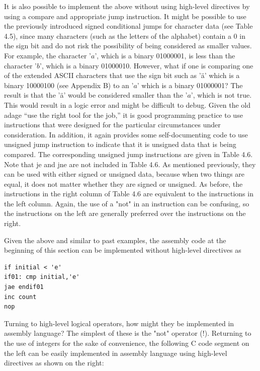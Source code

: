 \documentclass[10pt]{book}
\begin{document}
It is also possible to implement the above without using high-level directives by using a compare and appropriate jump instruction. It might be possible to use the previously introduced signed conditional jumps for character data (see Table 4.5), since many characters (such as the letters of the alphabet) contain a 0 in the sign bit and do not risk the possibility of being considered as smaller values. For example, the character '$a$', which is a binary 01000001, is less than the character '$b$', which is a binary 01000010. However, what if one is comparing one of the extended ASCII characters that use the sign bit such as 'ä' which is a binary 10000100 (see Appendix B) to an '$a$' which is a binary 01000001? The result is that the 'ä' would be considered smaller than the '$a$', which is not true. This would result in a logic error and might be difficult to debug. Given the old adage ``use the right tool for the job,'' it is good programming practice to use instructions that were designed for the particular circumstances under consideration. In addition, it again provides some self-documenting code to use unsigned jump instruction to indicate that it is unsigned data that is being compared. The corresponding unsigned jump instructions are given in Table 4.6.
Note that je and jne are not included in Table 4.6. As mentioned previously, they can be used with either signed or unsigned data, because when two things are equal, it does not matter whether they are signed or unsigned. As before, the instructions in the right column of Table 4.6 are equivalent to the instructions in the left column. Again, the use of a "not" in an instruction can be confusing, so the instructions on the left are generally preferred over the instructions on the right.

Given the above and similar to past examples, the assembly code at the beginning of this section can be implemented without high-level directives as

\begin{verbatim}
if initial < 'e'
if01: cmp initial,'e'
jae endif01
inc count
nop
\end{verbatim}

Turning to high-level logical operators, how might they be implemented in assembly language? The simplest of these is the "not" operator (!). Returning to the use of integers for the sake of convenience, the following C code segment on\\
the left can be easily implemented in assembly language using high-level directives as shown on the right:
\end{document}
